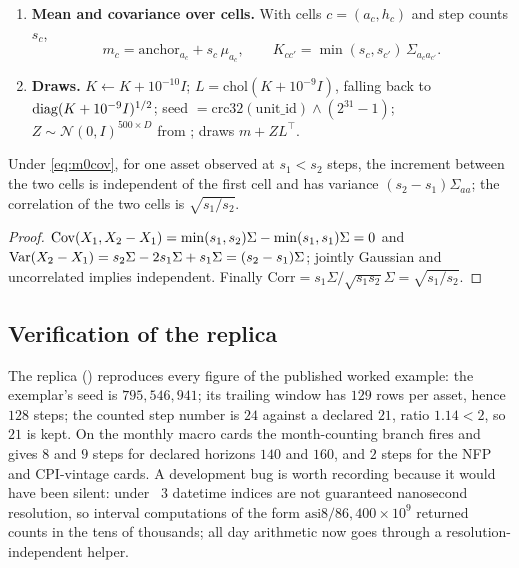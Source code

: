 \begin{enumerate}[leftmargin=*]
\item \textbf{Mean and covariance over cells.} With cells $c=(a_c,h_c)$ and step counts $s_c$,
\begin{equation}\label{eq:m0cov}
  m_c = \text{anchor}_{a_c} + s_c\,\mu_{a_c}, \qquad K_{cc'} = \min(s_c,s_{c'})\,\Sigma_{a_c a_{c'}} .
\end{equation}
\item \textbf{Draws.} $K\leftarrow K+10^{-10}I$; $L=\mathrm{chol}(K+10^{-9}I)$, falling back to $\operatorname{diag}(K+10^{-9}I)^{1/2}$;
seed $=\mathrm{crc32}(\text{unit\_id})\wedge(2^{31}-1)$; $Z\sim\mathcal N(0,I)^{500\times D}$ from ; draws
$m+ZL^\top$.
\end{enumerate}

\begin{proposition}\label{prop:m0path}
Under \eqref{eq:m0cov}, for one asset observed at $s_1<s_2$ steps, the increment between the two cells is independent of the first cell and
has variance $(s_2-s_1)\Sigma_{aa}$; the correlation of the two cells is $\sqrt{s_1/s_2}$.
\end{proposition}
\begin{proof}
$\operatorname{Cov}(X_1,X_2-X_1)=\min(s_1,s_2)\Sigma-\min(s_1,s_1)\Sigma=0$ and
$\operatorname{Var}(X_2-X_1)=s_2\Sigma-2s_1\Sigma+s_1\Sigma=(s_2-s_1)\Sigma$; jointly Gaussian and uncorrelated implies independent.
Finally $\mathrm{Corr}=s_1\Sigma/\sqrt{s_1s_2}\Sigma=\sqrt{s_1/s_2}$.
\end{proof}

\subsection{Verification of the replica}

The replica () reproduces every figure of the published worked example: the exemplar's seed is
$795{,}546{,}941$; its trailing window has $129$ rows per asset, hence $128$ steps; the counted step number is $24$ against a declared
$21$, ratio $1.14<2$, so $21$ is kept. On the monthly macro cards the month-counting branch fires and gives $8$ and $9$ steps for
declared horizons $140$ and $160$, and $2$ steps for the NFP and CPI-vintage cards. A development bug is worth recording because it would
have been silent: under ~3 datetime indices are not guaranteed nanosecond resolution, so interval computations of the form
$\text{asi8}/86{,}400\times10^9$ returned counts in the tens of thousands; all day arithmetic now goes through a resolution-independent
helper.

